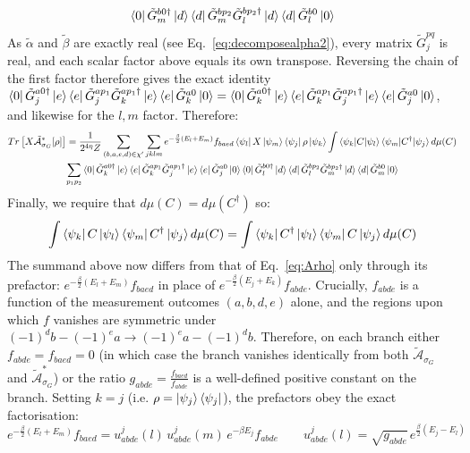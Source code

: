 \documentclass[aps,floatfix,10pt,amssymb,amsfont,amsmath,superscriptaddress,float,nofootinbib,longbibliography,nobalancelastpage,twocolumn]{revtex4-2}
\begin{document}
\begin{widetext}
\begin{multline}
    \bra{0}\tilde G_m^{b0\dagger}\ket{d}\bra{d}\tilde G_m^{bp_2}\tilde G_l^{bp_2\dagger}\ket{d}\bra{d}\tilde G_l^{b0}\ket{0}
\end{multline}
As $\tilde \alpha$ and $\tilde \beta$ are exactly real (see Eq.~\eqref{eq:decomposealpha2}), every matrix $\tilde G^{pq}_j$ is real, and each scalar factor above equals its own transpose. Reversing the chain of the first factor therefore gives the exact identity $\bra{0} \tilde G^{a0\dagger}_j\ket{e}\bra{e}\tilde G^{ap_1}_j\tilde G^{ap_1\dagger}_k\ket{e}\bra{e}\tilde G^{a0}_k\ket{0} = \bra{0} \tilde G^{a0\dagger}_k\ket{e}\bra{e}\tilde G^{ap_1}_k\tilde G^{ap_1\dagger}_j\ket{e}\bra{e}\tilde G^{a0}_j\ket{0}$, and likewise for the $l,m$ factor.
Therefore:
\begin{multline}
Tr\left[X\tilde{\mathcal{A}}^*_{\sigma_G}[\rho]\right] =\frac{1}{2^{4\eta}Z} \sum_{(b,a,e,d)\in \chi'}\sum_{jklm} e^{-\frac{\beta}{2}(E_l+E_m)}f_{baed} \bra{\psi_l}X\ket{\psi_m}\bra{\psi_j}\rho\ket{\psi_k} \int \braket{\psi_k|C|\psi_l}\braket{\psi_m|C^{\dagger}|\psi_j} d\mu(C)\\\sum_{p_1p_2} \bra{0} \tilde G^{a0\dagger}_k\ket{e}\bra{e}\tilde G^{ap_1}_k\tilde G^{ap_1\dagger}_j\ket{e}\bra{e}\tilde G^{a0}_j\ket{0}
    \bra{0}\tilde G_l^{b0\dagger}\ket{d}\bra{d}\tilde G_l^{bp_2}\tilde G_m^{bp_2\dagger}\ket{d}\bra{d}\tilde G_m^{b0}\ket{0}
\end{multline}
Finally, we require that $d\mu(C) = d\mu(C^{\dagger})$ so:
\begin{equation}
    \int  \bra{\psi_k}C\ket{\psi_{l}}\bra{\psi_m}C^{\dagger} \ket{\psi_j} d\mu(C) = \int  \bra{\psi_k}C^{\dagger}\ket{\psi_{l}}\bra{\psi_m}C \ket{\psi_j} d\mu(C)
\end{equation}
The summand above now differs from that of Eq.~\eqref{eq:Arho} only through its prefactor: $e^{-\frac{\beta}{2}(E_l+E_m)}f_{baed}$ in place of $e^{-\frac{\beta}{2}(E_j+E_k)}f_{abde}$. Crucially, $f_{abde}$ is a function of the measurement outcomes $(a,b,d,e)$ alone, and the regions upon which $f$ vanishes are symmetric under $(-1)^db-(-1)^ea \to (-1)^ea-(-1)^db$. Therefore, on each branch either $f_{abde} = f_{baed} = 0$ (in which case the branch vanishes identically from both $\tilde{\mathcal{A}}_{\sigma_G}$ and $\tilde{\mathcal{A}}^*_{\sigma_G}$) or the ratio $g_{abde} = \frac{f_{baed}}{f_{abde}}$ is a well-defined positive constant on the branch. Setting $k=j$ (i.e. $\rho = \ket{\psi_j}\bra{\psi_j}$), the prefactors obey the exact factorisation:
\begin{equation}
    e^{-\frac{\beta}{2}(E_l+E_m)}f_{baed} = u^{j}_{abde}(l)\, u^{j}_{abde}(m)\, e^{-\beta E_j}f_{abde} \qquad u^{j}_{abde}(l) = \sqrt{g_{abde}}\,e^{\frac{\beta}{2}(E_j-E_l)}

\end{equation}
\end{widetext}
\end{document}
